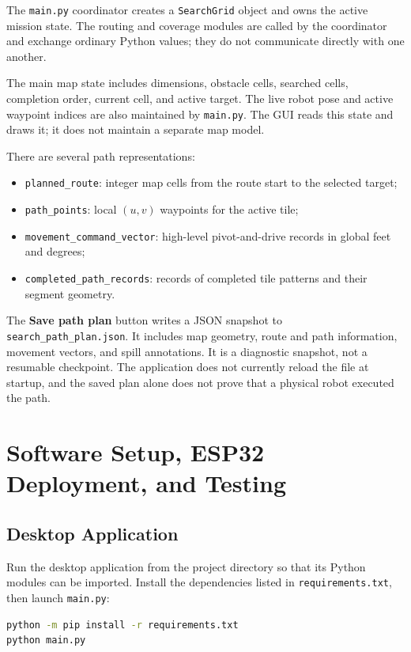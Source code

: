 \documentclass{article}
\begin{document}
The \texttt{main.py} coordinator creates a \texttt{SearchGrid} object and owns the active mission state. The routing and coverage modules are called by the coordinator and exchange ordinary Python values; they do not communicate directly with one another.

The main map state includes dimensions, obstacle cells, searched cells, completion order, current cell, and active target. The live robot pose and active waypoint indices are also maintained by \texttt{main.py}. The GUI reads this state and draws it; it does not maintain a separate map model.

There are several path representations:
\begin{itemize}
    \item \texttt{planned\_route}: integer map cells from the route start to the selected target;
    \item \texttt{path\_points}: local $(u,v)$ waypoints for the active tile;
    \item \texttt{movement\_command\_vector}: high-level pivot-and-drive records in global feet and degrees;
    \item \texttt{completed\_path\_records}: records of completed tile patterns and their segment geometry.
\end{itemize}

The \textbf{Save path plan} button writes a JSON snapshot to \texttt{search\_path\_plan.json}. It includes map geometry, route and path information, movement vectors, and spill annotations. It is a diagnostic snapshot, not a resumable checkpoint. The application does not currently reload the file at startup, and the saved plan alone does not prove that a physical robot executed the path.

\section{Software Setup, ESP32 Deployment, and Testing}

\subsection{Desktop Application}

Run the desktop application from the project directory so that its Python modules can be imported. Install the dependencies listed in \texttt{requirements.txt}, then launch \texttt{main.py}:

\begin{lstlisting}[language=bash]
python -m pip install -r requirements.txt
python main.py
\end{lstlisting}
\end{document}
